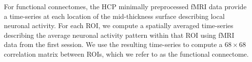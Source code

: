 \documentclass[12pt]{article}
\begin{document}
For functional connectomes, the HCP minimally preprocessed fMRI data provide a time-series at each location of the mid-thickness surface describing local neuronal activity. For each ROI, we compute a spatially averaged time-series describing the average neuronal activity pattern within that ROI using fMRI data from the first session. We use the resulting time-series to compute a $68 \times 68$ correlation matrix between ROIs, which we refer to as the functional connectome.


\vspace{-3.5mm}




\end{document}
